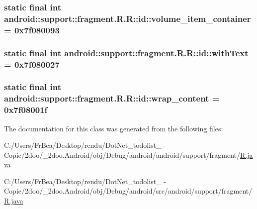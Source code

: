 \hypertarget{classandroid_1_1support_1_1fragment_1_1_r_1_1id_02d1c175a8aa5751b6aa445c5677aaf8}{
\subsubsection[{volume\_\-item\_\-container}]{\setlength{\rightskip}{0pt plus 5cm}static final int android::support::fragment.R.R::id::volume\_\-item\_\-container = 0x7f080093}}
\label{classandroid_1_1support_1_1fragment_1_1_r_1_1id_02d1c175a8aa5751b6aa445c5677aaf8}


\hypertarget{classandroid_1_1support_1_1fragment_1_1_r_1_1id_b3966dca73383e525d1fc20386969a27}{
\subsubsection[{withText}]{\setlength{\rightskip}{0pt plus 5cm}static final int android::support::fragment.R.R::id::withText = 0x7f080027}}
\label{classandroid_1_1support_1_1fragment_1_1_r_1_1id_b3966dca73383e525d1fc20386969a27}


\hypertarget{classandroid_1_1support_1_1fragment_1_1_r_1_1id_dd17ac50a512e7583b19e59c4cd2fd16}{
\subsubsection[{wrap\_\-content}]{\setlength{\rightskip}{0pt plus 5cm}static final int android::support::fragment.R.R::id::wrap\_\-content = 0x7f08001f}}
\label{classandroid_1_1support_1_1fragment_1_1_r_1_1id_dd17ac50a512e7583b19e59c4cd2fd16}




The documentation for this class was generated from the following files:\begin{CompactItemize}
\item 
C:/Users/FrBea/Desktop/rendu/DotNet\_\-todolist\_ - Copie/2doo/\_\-2doo.Android/obj/Debug/android/android/support/fragment/\hyperlink{android_2support_2fragment_2_r_8java}{R.java}\item 
C:/Users/FrBea/Desktop/rendu/DotNet\_\-todolist\_ - Copie/2doo/\_\-2doo.Android/obj/Debug/android/src/android/support/fragment/\hyperlink{src_2android_2support_2fragment_2_r_8java}{R.java}\end{CompactItemize}
